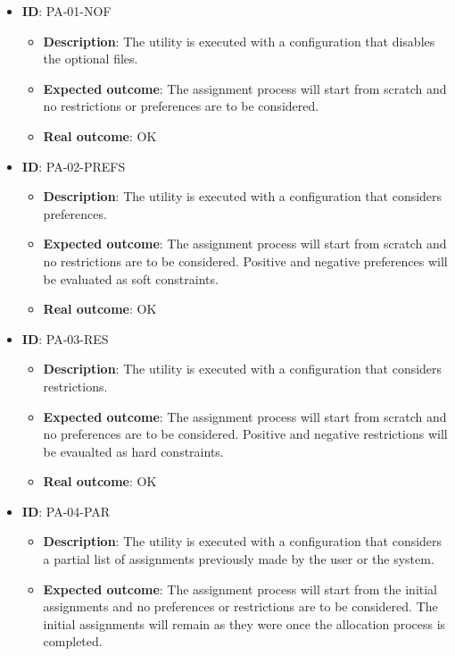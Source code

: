 \begin{itemize}
    \item \textbf{ID}: PA-01-NOF
        \begin{itemize}
            \item \textbf{Description}: The utility is executed with a configuration that disables the optional files.
            \item \textbf{Expected outcome}: The assignment process will start from scratch and no restrictions or preferences are to be considered.
            \item \textbf{Real outcome}: OK
        \end{itemize}
    \item \textbf{ID}: PA-02-PREFS
        \begin{itemize}
            \item \textbf{Description}: The utility is executed with a configuration that considers preferences.
            \item \textbf{Expected outcome}: The assignment process will start from scratch and no restrictions are to be considered. Positive and negative preferences will be evaluated as soft constraints.
            \item \textbf{Real outcome}: OK
        \end{itemize}
    \item \textbf{ID}: PA-03-RES
        \begin{itemize}
            \item \textbf{Description}: The utility is executed with a configuration that considers restrictions.
            \item \textbf{Expected outcome}: The assignment process will start from scratch and no preferences are to be considered. Positive and negative restrictions will be evaualted as hard constraints.
            \item \textbf{Real outcome}: OK
        \end{itemize}
    \item \textbf{ID}: PA-04-PAR
        \begin{itemize}
            \item \textbf{Description}: The utility is executed with a configuration that considers a partial list of assignments previously made by the user or the system.
            \item \textbf{Expected outcome}: The assignment process will start from the initial assignments and no preferences or restrictions are to be considered. The initial assignments will remain as they were once the allocation process is completed.

\end{itemize}
\end{itemize}
